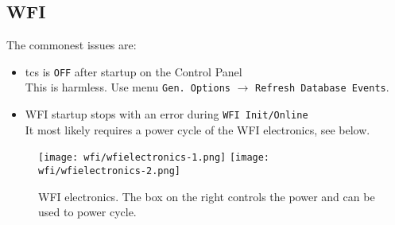 \documentclass[11pt,fleqn]{book} %
\begin{document}
\subsection{WFI}

The commonest issues are:
\begin{itemize}
  \item \gls{tcs} is \texttt{OFF} after startup on the Control Panel\\
   This is harmless. Use menu \texttt{Gen. Options} $\rightarrow$ \texttt{Refresh Database Events}.
  \item WFI startup stops with an error during \texttt{WFI Init/Online}\\
       It most likely requires a power cycle of the WFI electronics, see below.
\end{itemize}

\begin{figure}[ht]
	\texttt{[image: wfi/wfielectronics-1.png]}
	\linewidth
	\texttt{[image: wfi/wfielectronics-2.png]}
	\caption{WFI electronics.  The box on the right controls the power and can be used to power cycle.}
	\label{fig:wfielectronics}
\end{figure}
\end{document}
